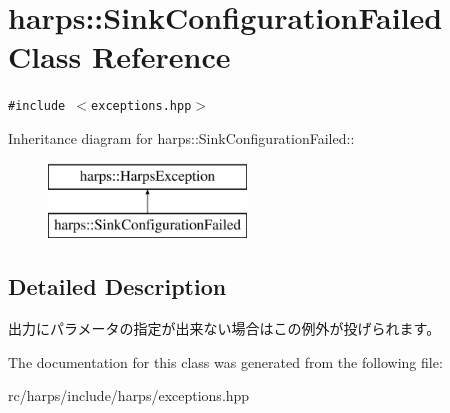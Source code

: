 \section{harps::SinkConfigurationFailed Class Reference}
\label{classharps_1_1SinkConfigurationFailed}
{\tt \#include $<$exceptions.hpp$>$}

Inheritance diagram for harps::SinkConfigurationFailed::\begin{figure}[H]
\begin{center}
\leavevmode
\includegraphics[height=2cm]{classharps_1_1SinkConfigurationFailed}
\end{center}
\end{figure}


\subsection{Detailed Description}
出力にパラメータの指定が出来ない場合はこの例外が投げられます。 

The documentation for this class was generated from the following file:\begin{CompactItemize}
\item 
rc/harps/include/harps/exceptions.hpp\end{CompactItemize}
